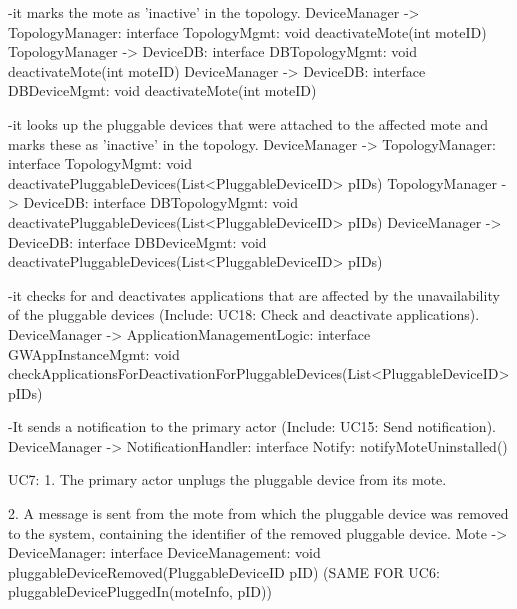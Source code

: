             -it marks the mote as 'inactive' in the topology.
                DeviceManager -> TopologyManager: interface TopologyMgmt: void deactivateMote(int moteID)
                TopologyManager -> DeviceDB: interface DBTopologyMgmt: void deactivateMote(int moteID)
                DeviceManager -> DeviceDB: interface DBDeviceMgmt: void deactivateMote(int moteID)

            -it looks up the pluggable devices that were attached to the affected mote and marks these as 'inactive' in the topology.
                DeviceManager -> TopologyManager: interface TopologyMgmt: void deactivatePluggableDevices(List<PluggableDeviceID> pIDs)
                TopologyManager -> DeviceDB: interface DBTopologyMgmt: void deactivatePluggableDevices(List<PluggableDeviceID> pIDs)
                DeviceManager -> DeviceDB: interface DBDeviceMgmt: void deactivatePluggableDevices(List<PluggableDeviceID> pIDs)

            -it checks for and deactivates applications that are affected by the unavailability of the pluggable devices (Include: UC18: Check and deactivate applications).
                DeviceManager -> ApplicationManagementLogic: interface GWAppInstanceMgmt: void checkApplicationsForDeactivationForPluggableDevices(List<PluggableDeviceID> pIDs)

            -It sends a notification to the primary actor (Include: UC15: Send notification).
                DeviceManager -> NotificationHandler: interface Notify: notifyMoteUninstalled()


    UC7:
        1. The primary actor unplugs the pluggable device from its mote.

        2. A message is sent from the mote from which the pluggable device was removed to the system, containing the identifier of the removed pluggable device.
            Mote -> DeviceManager: interface DeviceManagement: void pluggableDeviceRemoved(PluggableDeviceID pID)
            (SAME FOR UC6: pluggableDevicePluggedIn(moteInfo, pID))

